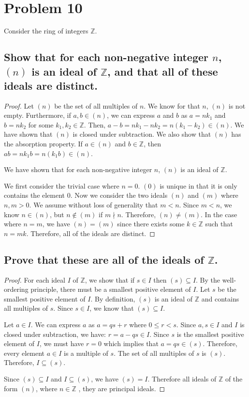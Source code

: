 \documentclass{article}
\theoremstyle{plain} %
\theoremstyle{definition} %
\begin{document}
\section*{Problem 10}
Consider the ring of integers $\mathbb{Z}$.

\subsection*{Show that for each non-negative integer $n$,
$(n)$ is an ideal of $\mathbb{Z}$, and that all of these ideals are distinct.}

\begin{proof}
    Let $(n)$ be the set of all multiples of $n$. We know for that $n$, $(n)$ is
not empty. Furthermore, if $a, b \in (n)$, we can express $a$ and $b$ as $a = nk_1$ and $b = nk_2$ for some $k_1, k_2 \in \mathbb{Z}$.
Then, $a-b = nk_1 - nk_2 = n(k_1 - k_2) \in (n)$. We have shown that $(n)$ is closed under subtraction.
We also show that $(n)$ has the absorption property. If $a \in (n)$ and $b \in \mathbb{Z}$, then $ab = nk_1b = n(k_1b) \in (n)$.

We have shown that for each non-negative integer $n$, $(n)$ is an ideal of $\mathbb{Z}$.

We first consider the trivial case where $n = 0$. $(0)$ is unique in that it is
only contains the element $0$. Now we consider the two ideals $(n)$ and $(m)$ where $n, m > 0$.
We assume without loss of generality that $m < n$. Since $m < n$, we know $n \in (n)$, but $n \notin (m)$ if 
$m \nmid n$. Therefore, $(n) \neq (m)$. In the case where $n = m$, we have $(n) = (m)$ since there exists some
$k \in \mathbb{Z}$ such that $n = mk$. Therefore, all of the ideals are distinct.
\end{proof}

\subsection*{Prove that these are all of the ideals of $\mathbb{Z}$.}
\begin{proof}
    For each ideal $I$ of $\mathbb{Z}$, we show that if $s \in I$ then $(s) \subseteq I$.
    By the well-ordering principle, there must be a smallest positive element of $I$.
    Let $s$ be the smallest positive element of $I$. By definition, $(s)$ is an ideal of $\mathbb{Z}$ and
    contains all multiples of $s$. Since $s \in I$, we know that $(s) \subseteq I$.

    Let $a \in I$. We can express $a$ as $a = qs + r$ where $0 \leq r < s$. Since $a,s \in I$ and $I$ is closed
    under subtraction, we have: $r = a - qs \in I$. Since $s$ is the smallest positive element of $I$, we must have $r = 0$
    which implies that $a = qs \in (s)$. Therefore, every element $a \in I$ is 
    a multiple of $s$. The set of all multiples of $s$ is $(s)$. Therefore, $I \subseteq (s)$.

    Since $(s) \subseteq I$ and $I \subseteq (s)$, we have $(s) = I$. Therefore all ideals of $\mathbb{Z}$ of the form $(n)$, where $n \in \mathbb{Z}$ , they 
    are principal ideals.
\end{proof}
\end{document}
